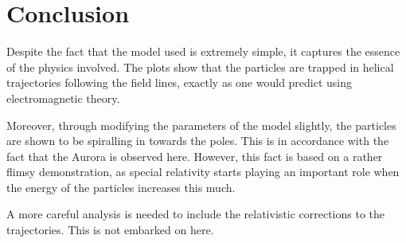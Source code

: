 \section{Conclusion}

Despite the fact that the model used is extremely simple, it captures the essence of the physics involved. The plots show that the particles are trapped in helical trajectories following the field lines, exactly as one would predict using electromagnetic theory. 

Moreover, through modifying the parameters of the model slightly, the particles are shown to be spiralling in towards the poles. This is in accordance with the fact that the Aurora is observed here. However, this fact is based on a rather flimsy demonstration, as special relativity starts playing an important role when the energy of the particles increases this much.

A more careful analysis is needed to include the relativistic corrections to the trajectories. This is not embarked on here. 

